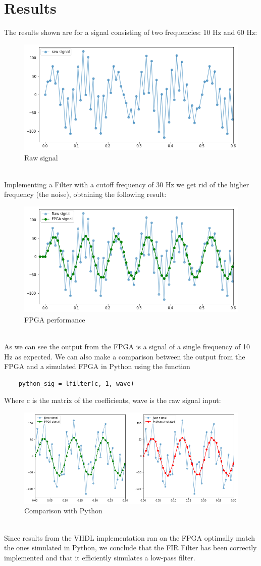 \documentclass[11pt,a4paper,twocolumn]{IEEEtran}
\begin{document}
	\section{Results}
	The results shown are for a signal consisting of two frequencies: 10 Hz and 60 Hz: 
	\begin{figure}[h]
		\centering
		\includegraphics[width=.9\linewidth]{img/rawsig}
		\caption{Raw signal}
	\end{figure}\\
	Implementing a Filter with a cutoff frequency of 30 Hz we get rid of the higher frequency (the noise), obtaining the following result:
	\begin{figure}[h]
		\centering
		\includegraphics[width=.9\linewidth]{img/fpgaresult}
		\caption{FPGA performance}
	\end{figure}\\
	As we can see the output from the FPGA is a signal of a single frequency of 10 Hz as expected. We can also make a comparison between the output from the FPGA and a simulated FPGA in Python using the function
	\begin{lstlisting}
	python_sig = lfilter(c, 1, wave)
	\end{lstlisting}
	Where c is the matrix of the coefficients, wave is the raw signal input:
	\begin{figure}[h]
		\centering
		\includegraphics[width=1\linewidth]{img/fpgapython}
		\caption{Comparison with Python}
	\end{figure}\\
	Since results from the VHDL implementation ran on the FPGA optimally match the ones
	simulated in Python, we conclude that the FIR Filter has been correctly implemented and that it
	efficiently simulates a low-pass filter.
\end{document}
